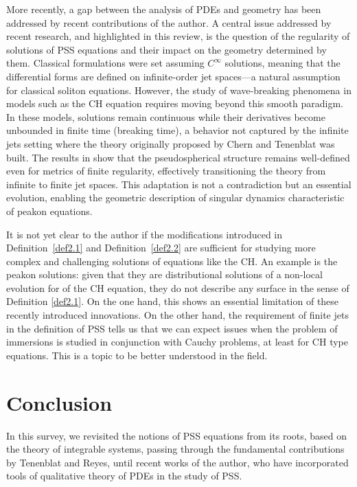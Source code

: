 \documentclass{cimart}
\begin{document}
More recently, a gap between the analysis of PDEs and geometry has been addressed by recent contributions of the author. A central issue addressed by recent research, and highlighted in this review, is the question of the regularity of solutions of PSS equations and their impact on the geometry determined by them. Classical formulations \cite{chern,tarcisio,reyes2002} were set assuming $C^\infty$ solutions, meaning that the differential forms are defined on infinite-order jet spaces—a natural assumption for classical soliton equations. However, the study of wave-breaking phenomena in models such as the CH equation requires moving beyond this smooth paradigm. In these models, solutions remain continuous while their derivatives become unbounded in finite time (breaking time), a behavior not captured by the infinite jets setting where the theory originally proposed by Chern and Tenenblat \cite{chern} was built. The results in \cite{freire-ch,freire-dp} show that the pseudospherical structure remains well-defined even for metrics of finite regularity, effectively transitioning the theory from infinite to finite jet spaces. This adaptation is not a contradiction but an essential evolution, enabling the geometric description of singular dynamics characteristic of peakon equations.

It is not yet clear to the author if the modifications introduced in Definition~\ref{def2.1} and Definition~\ref{def2.2} are sufficient for studying more complex and challenging solutions of equations like the CH. An example is the peakon solutions: given that they are distributional solutions of a non-local evolution for of the CH equation, they do not describe any surface in the sense of Definition \ref{def2.1}. On the one hand, this shows an essential limitation of these recently introduced innovations. On the other hand, the requirement of finite jets in the definition of PSS tells us that we can expect issues when the problem of immersions is studied in conjunction with Cauchy problems, at least for CH type equations. This is a topic to be better understood in the field.

\section{Conclusion}

In this survey, we revisited the notions of PSS equations from its roots, based on the theory of integrable systems, passing through the fundamental contributions by Tenenblat and Reyes, until recent works of the author, who have incorporated tools of qualitative theory of PDEs in the study of PSS.
\end{document}
